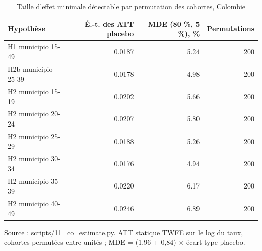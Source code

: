 \begin{table}[htbp]\centering
\begin{threeparttable}
\caption{Taille d'effet minimale détectable par permutation des cohortes, Colombie}\label{tab:co_mde}
\small
\begin{tabular}{lrrr}
\toprule
Hypothèse & É.-t. des ATT placebo & MDE (80 \%, 5 \%), \% & Permutations \\
\midrule
H1 municipio 15-49 & 0.0187 & 5.24 & 200 \\
H2b municipio 25-39 & 0.0178 & 4.98 & 200 \\
H2 municipio 15-19 & 0.0202 & 5.66 & 200 \\
H2 municipio 20-24 & 0.0207 & 5.80 & 200 \\
H2 municipio 25-29 & 0.0188 & 5.26 & 200 \\
H2 municipio 30-34 & 0.0176 & 4.94 & 200 \\
H2 municipio 35-39 & 0.0220 & 6.17 & 200 \\
H2 municipio 40-49 & 0.0246 & 6.89 & 200 \\
\bottomrule
\end{tabular}
\begin{tablenotes}\footnotesize
\item Source : scripts/11\_co\_estimate.py. ATT statique TWFE sur le log du taux, cohortes permutées entre unités ; MDE = (1,96 + 0,84) $\times$ écart-type placebo.
\end{tablenotes}
\end{threeparttable}
\end{table}
